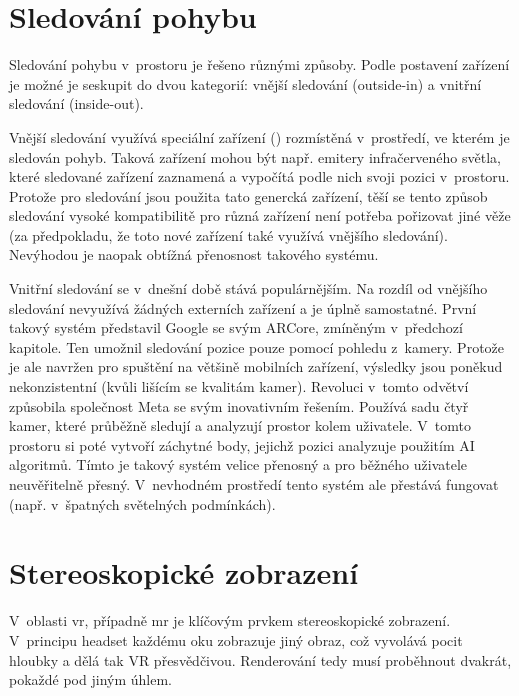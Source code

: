 \section{Sledování pohybu}

Sledování pohybu v~prostoru je řešeno různými způsoby. Podle postavení zařízení je možné je seskupit do dvou kategorií: vnější sledování (outside-in) a vnitřní sledování (inside-out).

Vnější sledování využívá speciální zařízení () rozmístěná v~prostředí, ve kterém je sledován pohyb. Taková zařízení mohou být např. emitery infračerveného světla, které sledované zařízení zaznamená a vypočítá podle nich svoji pozici v~prostoru. Protože pro sledování jsou použita tato genercká zařízení, těší se tento způsob sledování vysoké kompatibilitě \poml pro různá zařízení není potřeba pořizovat jiné věže (za předpokladu, že toto nové zařízení také využívá vnějšího sledování). Nevýhodou je naopak obtížná přenosnost takového systému. \cite{vr_tracking_suvi}

Vnitřní sledování se v~dnešní době stává populárnějším. Na rozdíl od vnějšího sledování nevyužívá žádných externích zařízení a je úplně samostatné. První takový systém představil Google se svým ARCore, zmíněným v~předchozí kapitole. Ten umožnil sledování pozice pouze pomocí pohledu z~kamery. Protože je ale navržen pro spuštění na většině mobilních zařízení, výsledky jsou poněkud nekonzistentní (kvůli lišícím se kvalitám kamer).
Revoluci v~tomto odvětví způsobila společnost Meta se svým inovativním řešením. Používá sadu čtyř kamer, které průběžně sledují a analyzují prostor kolem uživatele. V~tomto prostoru si poté vytvoří záchytné body, jejichž pozici analyzuje použitím AI algoritmů. Tímto je takový systém velice přenosný a pro běžného uživatele neuvěřitelně přesný. V~nevhodném prostředí tento systém ale přestává fungovat (např. v~špatných světelných podmínkách). \cite{vr_tracking_suvi} \cite{enwiki:1182789097}

\section{Stereoskopické zobrazení}

V~oblasti \gls{vr}, případně \gls{mr} je klíčovým prvkem stereoskopické zobrazení. V~principu headset každému oku zobrazuje jiný obraz, což vyvolává pocit hloubky a dělá tak VR přesvědčivou. Renderování tedy musí proběhnout dvakrát, pokaždé pod jiným úhlem. \cite{stereoskopie_diagram}

